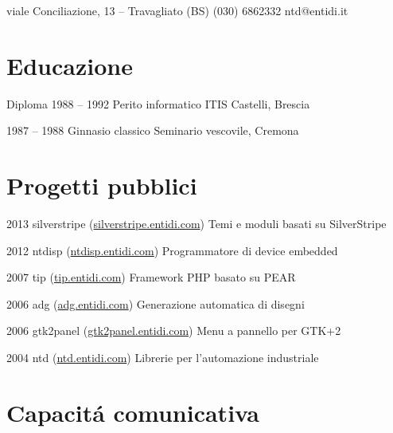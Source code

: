 \documentclass[fontsize=10pt]{tccv}
\begin{document}
    {viale Conciliazione, 13 -- Travagliato (BS)}
    {(030) 6862332}
    {ntd@entidi.it}

\section{Educazione}

\begin{yearlist}

\item[Diploma]{1988 -- 1992}
     {Perito informatico}
     {ITIS Castelli, Brescia}

\item{1987 -- 1988}
     {Ginnasio classico}
     {Seminario vescovile, Cremona}

\end{yearlist}

\section{Progetti pubblici}

\begin{yearlist}

\item{2013}
     {silverstripe (\href{http://silverstripe.entidi.com/}{silverstripe.entidi.com})}
     {Temi e moduli basati su SilverStripe}

\item{2012}
     {ntdisp (\href{http://ntdisp.entidi.com/}{ntdisp.entidi.com})}
     {Programmatore di device embedded}

\item{2007}
     {tip (\href{http://tip.entidi.com/}{tip.entidi.com})}
     {Framework PHP basato su PEAR}

\item{2006}
     {adg (\href{http://adg.entidi.com/}{adg.entidi.com})}
     {Generazione automatica di disegni}

\item{2006}
     {gtk2panel (\href{http://gtk2panel.entidi.com/}{gtk2panel.entidi.com})}
     {Menu a pannello per GTK+2}

\item{2004}
     {ntd (\href{http://ntd.entidi.com/}{ntd.entidi.com})}
     {Librerie per l'automazione industriale}

\end{yearlist}

\section{Capacit\'a comunicativa}
\end{document}
